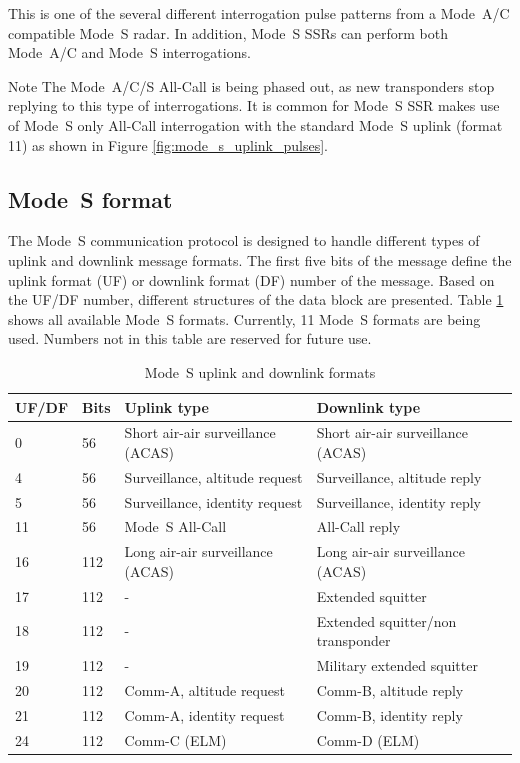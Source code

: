 This is one of the several different interrogation pulse patterns from a Mode~A/C compatible Mode~S radar. In addition, Mode~S SSRs can perform both Mode~A/C and Mode~S interrogations. 

\begin{notebox}{Note}
  The Mode~A/C/S All-Call is being phased out, as new transponders stop replying to this type of interrogations. It is common for Mode~S SSR makes use of Mode~S only All-Call interrogation with the standard Mode~S uplink (format 11) as shown in Figure \ref{fig:mode_s_uplink_pulses}.
\end{notebox}


\subsection{Mode~S format}

The Mode~S communication protocol is designed to handle different types of uplink and downlink message formats. The first five bits of the message define the uplink format (UF) or downlink format (DF) number of the message. Based on the UF/DF number, different structures of the data block are presented. Table \ref{tb:mode_s_formats} shows all available Mode~S formats. Currently, 11 Mode~S formats are being used. Numbers not in this table are reserved for future use.

\begin{table}[ht]
\centering
\footnotesize
\caption{Mode~S uplink and downlink formats}
\label{tb:mode_s_formats}
\begin{tabular}{|l|l|l|l|}
\hline
\textbf{UF/DF} & \textbf{Bits} & \textbf{Uplink type} & \textbf{Downlink type} \\ \hline\hline
0 & 56 & Short air-air surveillance (ACAS) & Short air-air surveillance (ACAS) \\ \hline
4 & 56 & Surveillance, altitude request & Surveillance, altitude reply \\ \hline
5 & 56 & Surveillance, identity request & Surveillance, identity reply \\ \hline
11 & 56 & Mode~S All-Call & All-Call reply \\ \hline
\hline
16 & 112 & Long air-air surveillance (ACAS) & Long air-air surveillance (ACAS) \\ \hline
17 & 112 & - & Extended squitter \\ \hline
18 & 112 & - & Extended squitter/non transponder \\ \hline
19 & 112 & - & Military extended squitter \\ \hline
20 & 112 & Comm-A, altitude request & Comm-B, altitude reply \\ \hline
21 & 112 & Comm-A, identity request & Comm-B, identity reply \\ \hline
24 & 112 & Comm-C (ELM) & Comm-D (ELM) \\ \hline
\end{tabular}
\end{table}



